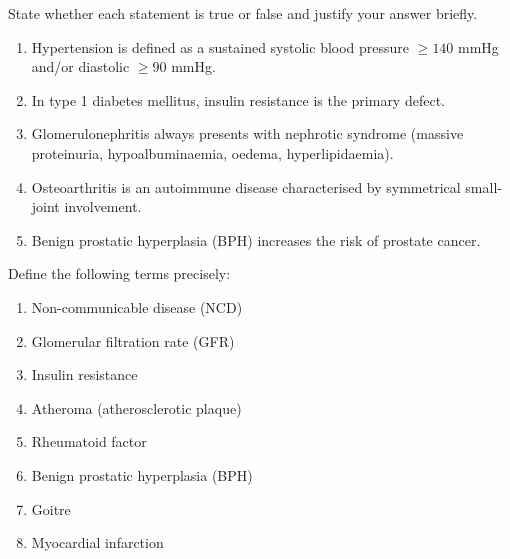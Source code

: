 \documentclass[11pt]{article}
\newcommand{\cle}[1]{{\popxbold\color{popdark}#1}}
\begin{document}
\begin{exercice}
State whether each statement is true or false and justify your answer briefly.
\begin{enumerate}
\item Hypertension is defined as a sustained systolic blood pressure $\ge 140$ mmHg and/or diastolic $\ge 90$ mmHg.
\item In type 1 diabetes mellitus, insulin resistance is the primary defect.
\item Glomerulonephritis always presents with nephrotic syndrome (massive proteinuria, hypoalbuminaemia, oedema, hyperlipidaemia).
\item Osteoarthritis is an autoimmune disease characterised by symmetrical small-joint involvement.
\item Benign prostatic hyperplasia (BPH) increases the risk of prostate cancer.
\end{enumerate}
\end{exercice}

\begin{exercice}
Define the following terms precisely:
\begin{enumerate}
\item \cle{Non-communicable disease (NCD)}
\item \cle{Glomerular filtration rate (GFR)}
\item \cle{Insulin resistance}
\item \cle{Atheroma (atherosclerotic plaque)}
\item \cle{Rheumatoid factor}
\item \cle{Benign prostatic hyperplasia (BPH)}
\item \cle{Goitre}
\item \cle{Myocardial infarction}
\end{enumerate}
\end{exercice}
\end{document}
